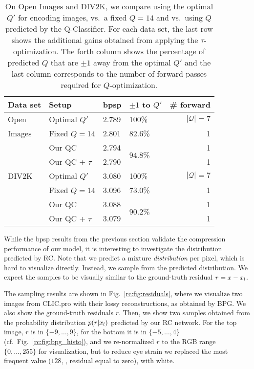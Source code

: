 \begin{table}
    \centering
    \begin{tabular}{llllr}
        \toprule
         Data set & Setup          & bpsp  & $\pm1$ to $Q'$ & \# forward\\
        \midrule
        Open    & Optimal $Q'$    & 2.789 & 100\%  & $|\mathcal Q| = 7$  \\
        Images  & Fixed $Q=14$     & 2.801 & 82.6\% & 1 \\
                & Our QC          & 2.794 & \multirow{2}{*}{94.8\%} & 1 \\
                & Our QC + $\tau$ & 2.790 &   & 1 \\
        \midrule
        DIV2K & Optimal $Q'$    & 3.080 & 100\%  & $|\mathcal Q| = 7$  \\
              & Fixed $Q=14$     & 3.096 & 73.0\% & 1 \\
              & Our QC          & 3.088 & \multirow{2}{*}{90.2\%} & 1 \\
              & Our QC + $\tau$ & 3.079 &  & 1 \\
        \bottomrule
    \end{tabular}
    \caption{\label{rc:table:qcomp}
    On Open Images and DIV2K, we compare using the optimal $Q'$ for encoding images, vs.\ a fixed $Q=14$ and vs.\ using $Q$ predicted by the Q-Classifier. For each data set, the last row shows the additional gains obtained from applying the $\tau$-optimization.
    The forth column shows the percentage of predicted $Q$ that are $\pm1$ away from the optimal $Q'$ and the last column corresponds to the number of forward passes required for $Q$-optimization.
    }
\end{table}

While the bpsp results from the previous section validate the compression performance of our model, it is interesting to investigate the distribution predicted by RC. Note that we predict a mixture \emph{distribution} per pixel, which is hard to visualize directly. Instead, we sample from the predicted distribution. We expect the samples to be visually similar to the ground-truth residual $r=x-x_l$.

The sampling results are shown in Fig.~\ref{rc:fig:residuals}, where we visualize two images from CLIC.pro with their lossy reconstructions, as obtained by BPG. We also show the ground-truth residuals $r$. Then, we show two samples obtained from the probability distribution $p(r|x_l)$ predicted by our RC network. For the top image, $r$ is in $\{-9, \dots, 9\}$, for the bottom it is in $\{-5, \dots, 4\}$ (cf.\ Fig.~\ref{rc:fig:bpg_histo}), and we re-normalized $r$ to the RGB range $\{0, \dots, 255\}$ for visualization, but to reduce eye strain we replaced the most frequent value ($128$, \ie, residual equal to zero), with white. 

